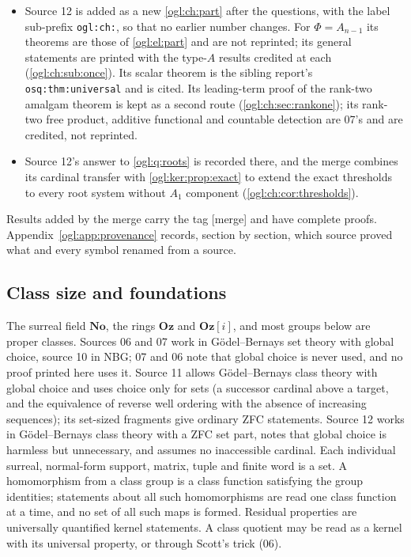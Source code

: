 \documentclass[11pt,oneside]{article}
\numberwithin{equation}{section}
\theoremstyle{definition}
\theoremstyle{remark}
\newcommand{\No}{\mathbf{No}}
\newcommand{\Oz}{\mathbf{Oz}}
\newcommand{\GOz}{\mathbf{Oz}[i]}
\newcommand{\mergetag}{\textup{\textsf{\small[merge]}}}
\newcommand{\replabel}[1]{\nolinkurl{#1}}
\begin{document}
\begin{itemize}[leftmargin=*]
kernel; \cref{ogl:el:prop:split} (06) proves the identity, so 11's
statements about both groups are printed as statements about $P_n$. 11's
set-sized ring is the ring $R^{11}_\kappa$ of the sibling report
(\replabel{osq:rel:lem:embedding}; the superscript there names that report's
manuscript 11, not source 11 here, and the ring is written $R_{<\kappa}$
below); its ring-level facts are cited there,
and the merge combines them with 11's exact-threshold criterion
(\cref{ogl:ker:prop:exact}).
\item Source 12 is added as a new \cref{ogl:ch:part} after the questions,
with the label sub-prefix \texttt{ogl:ch:}, so that no earlier number changes.
For $\Phi=A_{n-1}$ its theorems are those of \cref{ogl:el:part} and are not
reprinted; its general statements are printed with the type-$A$ results
credited at each (\cref{ogl:ch:sub:once}). Its scalar theorem is the sibling
report's \replabel{osq:thm:universal} and is cited. Its leading-term proof of
the rank-two amalgam theorem is kept as a second route
(\cref{ogl:ch:sec:rankone}); its rank-two free product, additive functional and
countable detection are 07's and are credited, not reprinted.
\item Source 12's answer to \cref{ogl:q:roots} is recorded there, and the merge
combines its cardinal transfer with \cref{ogl:ker:prop:exact} to extend the
exact thresholds to every root system without $A_1$ component
(\cref{ogl:ch:cor:thresholds}).
\end{itemize}
Results added by the merge carry the tag \mergetag{} and have complete proofs.
Appendix~\ref{ogl:app:provenance} records, section by section, which source proved
what and every symbol renamed from a source.

\subsection{Class size and foundations}\label{ogl:sub:foundations}

The surreal field $\No$, the rings $\Oz$ and $\GOz$, and most groups below are
proper classes. Sources 06 and 07 work in G\"odel--Bernays set theory with
global choice, source 10 in NBG; 07 and 06 note that global choice is never
used, and no proof printed here uses it. Source 11 allows G\"odel--Bernays
class theory with global choice and uses choice only for sets (a successor
cardinal above a target, and the equivalence of reverse well ordering with the
absence of increasing sequences); its set-sized fragments give ordinary ZFC
statements. Source 12 works in G\"odel--Bernays class theory with a ZFC set
part, notes that global choice is harmless but unnecessary, and assumes no
inaccessible cardinal. Each individual surreal, normal-form
support, matrix, tuple and finite word is a set. A homomorphism from a class
group is a class function satisfying the group identities; statements about
all such homomorphisms are read one class function at a time, and no set of
all such maps is formed. Residual properties are universally quantified kernel
statements. A class quotient may be read as a kernel with its universal
property, or through Scott's trick (06).
\end{document}
